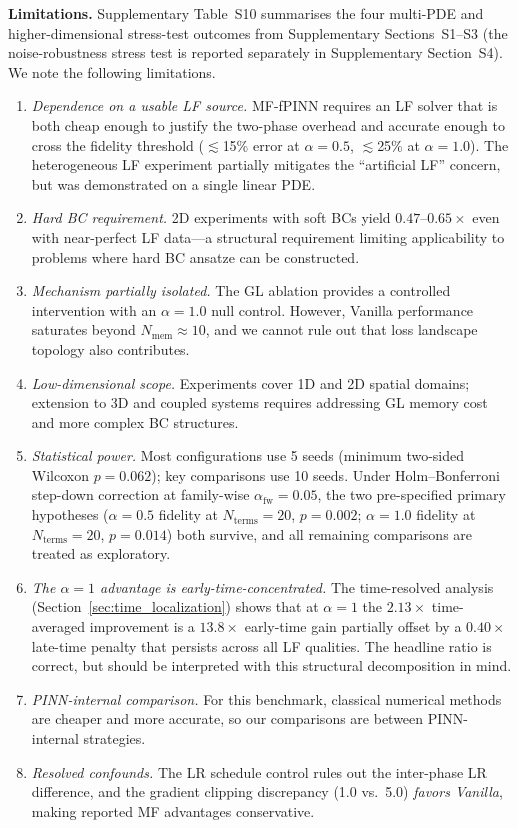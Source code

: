 \documentclass[11pt]{article}
\begin{document}
\textbf{Limitations.} Supplementary Table~S10 summarises the four multi-PDE and higher-dimensional stress-test outcomes from Supplementary Sections~S1--S3 (the noise-robustness stress test is reported separately in Supplementary Section~S4). We note the following limitations.
\begin{enumerate}
\item \emph{Dependence on a usable LF source.} MF-fPINN requires an LF solver that is both cheap enough to justify the two-phase overhead and accurate enough to cross the fidelity threshold ($\lesssim$15\% error at $\alpha = 0.5$, $\lesssim$25\% at $\alpha = 1.0$). The heterogeneous LF experiment partially mitigates the ``artificial LF'' concern, but was demonstrated on a single linear PDE.
\item \emph{Hard BC requirement.} 2D experiments with soft BCs yield $0.47$--$0.65\times$ even with near-perfect LF data---a structural requirement limiting applicability to problems where hard BC ansatze can be constructed.
\item \emph{Mechanism partially isolated.} The GL ablation provides a controlled intervention with an $\alpha = 1.0$ null control. However, Vanilla performance saturates beyond $N_{\mathrm{mem}} \approx 10$, and we cannot rule out that loss landscape topology also contributes.
\item \emph{Low-dimensional scope.} Experiments cover 1D and 2D spatial domains; extension to 3D and coupled systems requires addressing GL memory cost and more complex BC structures.
\item \emph{Statistical power.} Most configurations use 5 seeds (minimum two-sided Wilcoxon $p = 0.062$); key comparisons use 10 seeds. Under Holm--Bonferroni step-down correction at family-wise $\alpha_{\mathrm{fw}} = 0.05$, the two pre-specified primary hypotheses ($\alpha = 0.5$ fidelity at $N_{\mathrm{terms}} = 20$, $p = 0.002$; $\alpha = 1.0$ fidelity at $N_{\mathrm{terms}} = 20$, $p = 0.014$) both survive, and all remaining comparisons are treated as exploratory.
\item \emph{The $\alpha=1$ advantage is early-time-concentrated.} The time-resolved analysis (Section~\ref{sec:time_localization}) shows that at $\alpha = 1$ the $2.13\times$ time-averaged improvement is a $13.8\times$ early-time gain partially offset by a $0.40\times$ late-time penalty that persists across all LF qualities. The headline ratio is correct, but should be interpreted with this structural decomposition in mind.
\item \emph{PINN-internal comparison.} For this benchmark, classical numerical methods are cheaper and more accurate, so our comparisons are between PINN-internal strategies.
\item \emph{Resolved confounds.} The LR schedule control rules out the inter-phase LR difference, and the gradient clipping discrepancy (1.0 vs.\ 5.0) \emph{favors Vanilla}, making reported MF advantages conservative.
\end{enumerate}
\end{document}
